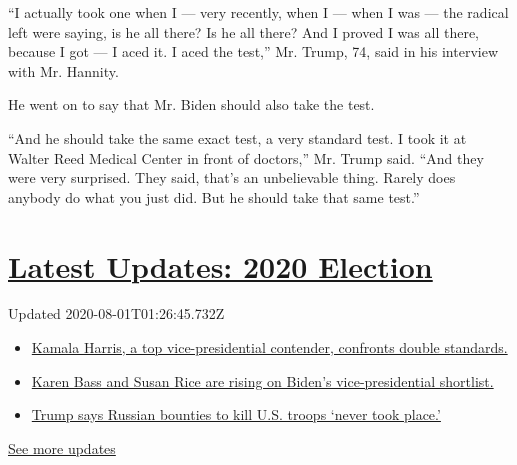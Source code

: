 ``I actually took one when I --- very recently, when I --- when I was
--- the radical left were saying, is he all there? Is he all there? And
I proved I was all there, because I got --- I aced it. I aced the
test,'' Mr. Trump, 74, said in his interview with Mr. Hannity.

He went on to say that Mr. Biden should also take the test.

``And he should take the same exact test, a very standard test. I took
it at Walter Reed Medical Center in front of doctors,'' Mr. Trump said.
``And they were very surprised. They said, that's an unbelievable thing.
Rarely does anybody do what you just did. But he should take that same
test.''

\hypertarget{latest-updates-2020-election}{%
\section{\texorpdfstring{\href{https://www.nytimes.com/2020/07/31/us/elections/biden-vs-trump.html?action=click\&pgtype=Article\&state=default\&region=MAIN_CONTENT_1\&context=storylines_live_updates}{Latest
Updates: 2020
Election}}{Latest Updates: 2020 Election}}\label{latest-updates-2020-election}}

Updated 2020-08-01T01:26:45.732Z

\begin{itemize}
\tightlist
\item
  \href{https://www.nytimes.com/2020/07/31/us/elections/biden-vs-trump.html?action=click\&pgtype=Article\&state=default\&region=MAIN_CONTENT_1\&context=storylines_live_updates\#link-29fdff45}{Kamala
  Harris, a top vice-presidential contender, confronts double
  standards.}
\item
  \href{https://www.nytimes.com/2020/07/31/us/elections/biden-vs-trump.html?action=click\&pgtype=Article\&state=default\&region=MAIN_CONTENT_1\&context=storylines_live_updates\#link-13ec3d9c}{Karen
  Bass and Susan Rice are rising on Biden's vice-presidential
  shortlist.}
\item
  \href{https://www.nytimes.com/2020/07/31/us/elections/biden-vs-trump.html?action=click\&pgtype=Article\&state=default\&region=MAIN_CONTENT_1\&context=storylines_live_updates\#link-49e9a016}{Trump
  says Russian bounties to kill U.S. troops `never took place.'}
\end{itemize}

\href{https://www.nytimes.com/2020/07/31/us/elections/biden-vs-trump.html?action=click\&pgtype=Article\&state=default\&region=MAIN_CONTENT_1\&context=storylines_live_updates}{See
more updates}

